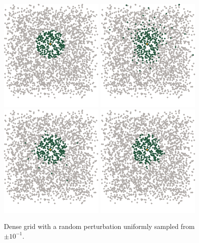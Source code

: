 \documentclass[review,supplement,onefignum,onetabnum]{siamonline220329}
\begin{document}
\begin{figure}[H]
  \centering
  \includegraphics{figures/precompiled/grid_1e-1/points_1.pdf}%
  \quad
  \includegraphics{figures/precompiled/grid_1e-1/points_2.pdf}%
  \quad
  \includegraphics{figures/precompiled/grid_1e-1/points_3.pdf}%
  \quad
  \includegraphics{figures/precompiled/grid_1e-1/points_4.pdf}%
  \caption{
    Dense grid with a random perturbation
    uniformly sampled from \( \pm 10^{-1} \).
  }
\end{figure}
\end{document}
